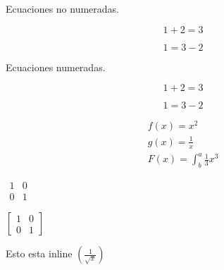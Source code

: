 \documentclass[a4paper,11pt]{article}                 %
\begin{document}
  Ecuaciones no numeradas.
  
  \begin{equation*}                                   %
    1 + 2 = 3 
  \end{equation*}

  \begin{equation*}                                   %
    1 = 3 - 2
  \end{equation*}

  Ecuaciones numeradas.
  
  \begin{equation}                                   %
    1 + 2 = 3 
  \end{equation}

  \begin{equation}                                   %
    1 = 3 - 2
  \end{equation}
  
  \begin{align*}                                     %
    f(x) = x^2\\
    g(x) = \frac{1}{x}\\
    F(x) = \int^a_b \frac{1}{3}x^3
  \end{align*}

  \begin{center}
    $
      \begin{matrix}
        1 & 0\\
        0 & 1
      \end{matrix}
    $
  \end{center}
  \begin{center}
    $
      \left[
        \begin{matrix}
          1 & 0\\
          0 & 1
        \end{matrix}
      \right]
    $  
  \end{center}
  
  Esto esta inline $\left(\frac{1}{\sqrt{x}}\right)$  %
  
\end{document}
